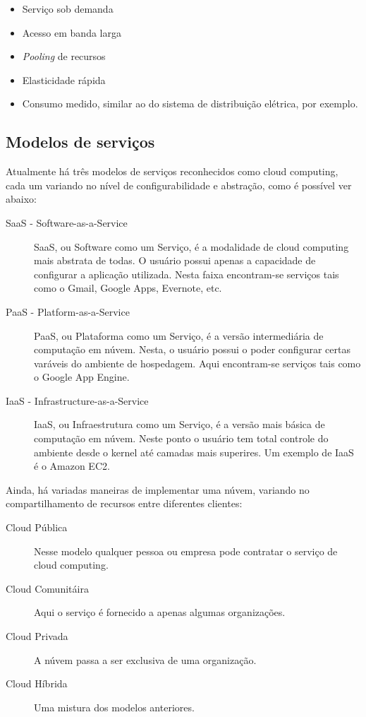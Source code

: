 \documentclass[brazil,12pt]{article}
\begin{document}
\begin{itemize}
  \item Serviço sob demanda
  \item Acesso em banda larga
  \item \emph{Pooling} de recursos
  \item Elasticidade rápida
  \item Consumo medido, similar ao do sistema de distribuição elétrica, por
  exemplo.
\end{itemize}

\subsection{Modelos de serviços}
Atualmente há três modelos de serviços reconhecidos como cloud computing, cada
um variando no nível de configurabilidade e abstração, como é possível ver
abaixo:

\begin{description}
  \item[SaaS - Software-as-a-Service] SaaS, ou Software como um Serviço, é a
  modalidade de cloud computing mais abstrata de todas. O usuário possui apenas
  a capacidade de configurar a aplicação utilizada. Nesta faixa encontram-se
  serviços tais como o Gmail, Google Apps, Evernote, etc.
  \item[PaaS - Platform-as-a-Service] PaaS, ou Plataforma como um Serviço, é a
  versão intermediária de computação em núvem. Nesta, o usuário possui o poder
  configurar certas varáveis do ambiente de hospedagem. Aqui encontram-se
  serviços tais como o Google App Engine.
  \item[IaaS - Infrastructure-as-a-Service] IaaS, ou Infraestrutura como um
  Serviço, é a versão mais básica de computação em núvem. Neste ponto o usuário
  tem total controle do ambiente desde o kernel até camadas mais superires. Um
  exemplo de IaaS é o Amazon EC2.
\end{description}

Ainda, há variadas maneiras de implementar uma núvem, variando no
compartilhamento de recursos entre diferentes clientes:

\begin{description}
  \item[Cloud Pública] Nesse modelo qualquer pessoa ou empresa pode contratar o
  serviço de cloud computing.
  \item[Cloud Comunitáira] Aqui o serviço é fornecido a apenas algumas
  organizações.
  \item[Cloud Privada] A núvem passa a ser exclusiva de uma organização.
  \item[Cloud Híbrida] Uma mistura dos modelos anteriores.
\end{description}
\end{document}
